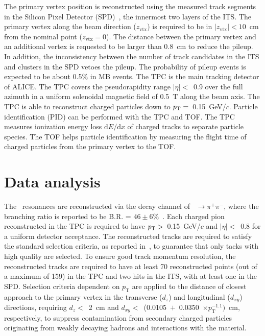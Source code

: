 The primary vertex position is reconstructed using the measured track segments in the Silicon Pixel Detector (SPD)~\cite{Santoro2009:ALICESPD}, the innermost two layers of the ITS. The primary vertex along the beam direction ($z_\mathrm{vtx}$) is required to be in $|z_\mathrm{vtx}|<10$~cm from the nominal point ($z_\mathrm{vtx}=0$). The distance between the primary vertex and an additional vertex is requested to be larger than 0.8~cm to reduce the pileup. In addition, the inconsistency between the number of track candidates in the ITS and clusters in the SPD vetoes the pileup. The probability of pileup events is expected to be about 0.5\% in MB events. The TPC is the main tracking detector of ALICE. The TPC covers the pseudorapidity range $|\eta|<$~0.9 over the full azimuth in a uniform solenoidal magnetic field of 0.5~T along the beam axis. The TPC is able to reconstruct charged particles down to $p_{\rm{T}}=$~0.15~GeV/$c$. Particle identification (PID) can be performed with the TPC and TOF. The TPC measures ionization energy loss $\mathrm{d}E/\mathrm{d}x$ of charged tracks to separate particle species. The TOF helps particle identification by measuring the flight time of charged particles from the primary vertex to the TOF.

\section{Data analysis}

The \fzero~resonances are reconstructed via the decay channel of \fzero~$\rightarrow \pi^{+}\pi^{-}$, where the branching ratio is reported to be B.R. = $46\pm6$\%~\cite{Stone:2013eaa}. Each charged pion reconstructed in the TPC is required to have $p_{\rm{T}}>$~0.15~GeV/$c$ and $|\eta|<$~0.8 for a uniform detector acceptance. The reconstructed tracks are required to satisfy the standard selection criteria, as reported in~\cite{ALICE:2022qnb}, to guarantee that only tacks with high quality are selected. To ensure good track momentum resolution, the reconstructed tracks are required to have at least 70 reconstructed points (out of a maximum of 159) in the TPC and two hits in the ITS, with at least one in the SPD. Selection criteria dependent on $p_{\mathrm{T}}$ are applied to the distance of closest approach to the primary vertex in the transverse ($d_{z}$) and longitudinal ($d_{xy}$) directions, requiring $d_{z}<$~2~cm and $d_{xy}<$~(0.0105~$+$~0.0350~$\times p_{\mathrm{T}}^{-1.1})$~cm, respectively, to suppress contamination from secondary charged particles originating from weakly decaying hadrons and interactions with the material.

